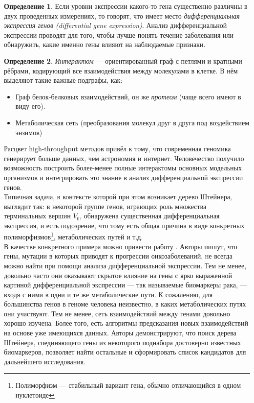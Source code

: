 \documentclass[11pt,a4paper]{report}
\theoremstyle{definition}
\theoremstyle{definition}
\theoremstyle{definition}
\newtheorem{definition}{Определение}[section]
\begin{document}
	\begin{definition}
		Если уровни экспрессии какого-то гена существенно различны в двух проведенных измерениях, то говорят, что имеет место \textit{дифференциальная экспрессия генов (differential gene expression)}. Анализ дифференциальной экспрессии проводят для того, чтобы лучше понять течение заболевания или обнаружить, какие именно гены влияют на наблюдаемые признаки.
	\end{definition}
	\begin{definition}
		\textit{Интерактом} — ориентированный граф с петлями и кратными рёбрами, кодирующий все взаимодействия между молекулами в клетке. В нём выделяют такие важные подграфы, как:
		\begin{itemize}
			\item Граф белок-белковых взаимодействий, он же \textit{протеом} (чаще всего имеют в виду его).
			\item Метаболическая сеть (преобразования молекул друг в друга под воздействием энзимов)
		\end{itemize}
	\end{definition}
	\noindent Расцвет high-throughput методов привёл к тому, что современная геномика генерирует больше данных, чем астрономия и интернет. Человечество получило возможность построить более-менее полные интерактомы основных модельных организмов и интегрировать это знание в анализ дифференциальной экспрессии генов.\\
	
	\noindent Типичная задача, в контексте которой при этом возникает дерево Штейнера, выглядит так: в некоторой группе генов, играющих роль множества терминальных вершин $V_0$, обнаружена существенная дифференциальная экспрессия, и есть подозрение, что тому есть общая причина в виде конкретных полиморфизмов\footnote{Полиморфизм — стабильный вариант гена, обычно отличающийся в одном нуклетоиде}, метаболических путей и т.д.\\
	
	\noindent В качестве конкретного примера можно привести работу \cite{BCM}. Авторы пишут, что гены, мутации в которых приводят к прогрессии онкозаболеваний, не всегда можно найти при помощи анализа дифференциальной экспрессии. Тем не менее, довольно часто они оказывают скрытое влияние на гены с ярко выраженной картиной дифференциальной экспрессии — так называемые биомаркеры рака, — входя с ними в одни и те же метаболические пути. К сожалению, для большинства генов в геноме человека неизвестно, в каких метаболических путях они участвуют. Тем не менее, сеть взаимодействий между генами довольно хорошо изучена. Более того, есть алгоритмы предсказания новых взаимодействий на основе уже имеющихся данных. Авторы демонстрируют, что поиск дерева Штейнера, соединяющего гены из некоторого поднабора достоверно известных биомаркеров, позволяет найти остальные и сформировать список кандидатов для дальнейшего исследования. \\
	 
\end{document}
